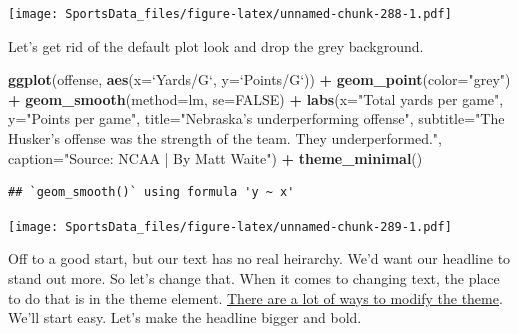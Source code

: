 \documentclass[
]{book}
\newenvironment{Shaded}{\begin{snugshade}}{\end{snugshade}}
\newcommand{\DataTypeTok}[1]{\textcolor[rgb]{0.13,0.29,0.53}{#1}}
\newcommand{\KeywordTok}[1]{\textcolor[rgb]{0.13,0.29,0.53}{\textbf{#1}}}
\newcommand{\NormalTok}[1]{#1}
\newcommand{\OperatorTok}[1]{\textcolor[rgb]{0.81,0.36,0.00}{\textbf{#1}}}
\newcommand{\OtherTok}[1]{\textcolor[rgb]{0.56,0.35,0.01}{#1}}
\newcommand{\StringTok}[1]{\textcolor[rgb]{0.31,0.60,0.02}{#1}}
\begin{document}
\texttt{[image: SportsData\_files/figure-latex/unnamed-chunk-288-1.pdf]}

Let's get rid of the default plot look and drop the grey background.

\begin{Shaded}
\begin{Highlighting}[]
\KeywordTok{ggplot}\NormalTok{(offense, }\KeywordTok{aes}\NormalTok{(}\DataTypeTok{x=}\StringTok{`}\DataTypeTok{Yards/G}\StringTok{`}\NormalTok{, }\DataTypeTok{y=}\StringTok{`}\DataTypeTok{Points/G}\StringTok{`}\NormalTok{)) }\OperatorTok{+}\StringTok{ }
\StringTok{  }\KeywordTok{geom_point}\NormalTok{(}\DataTypeTok{color=}\StringTok{"grey"}\NormalTok{) }\OperatorTok{+}\StringTok{ }\KeywordTok{geom_smooth}\NormalTok{(}\DataTypeTok{method=}\NormalTok{lm, }\DataTypeTok{se=}\OtherTok{FALSE}\NormalTok{) }\OperatorTok{+}\StringTok{ }
\StringTok{  }\KeywordTok{labs}\NormalTok{(}\DataTypeTok{x=}\StringTok{"Total yards per game"}\NormalTok{, }\DataTypeTok{y=}\StringTok{"Points per game"}\NormalTok{, }\DataTypeTok{title=}\StringTok{"Nebraska's underperforming offense"}\NormalTok{, }\DataTypeTok{subtitle=}\StringTok{"The Husker's offense was the strength of the team. They underperformed."}\NormalTok{, }\DataTypeTok{caption=}\StringTok{"Source: NCAA | By Matt Waite"}\NormalTok{) }\OperatorTok{+}\StringTok{ }
\StringTok{  }\KeywordTok{theme_minimal}\NormalTok{()}
\end{Highlighting}
\end{Shaded}

\begin{verbatim}
## `geom_smooth()` using formula 'y ~ x'
\end{verbatim}

\texttt{[image: SportsData\_files/figure-latex/unnamed-chunk-289-1.pdf]}

Off to a good start, but our text has no real heirarchy. We'd want our headline to stand out more. So let's change that. When it comes to changing text, the place to do that is in the theme element. \href{http://ggplot2.tidyverse.org/reference/theme.html}{There are a lot of ways to modify the theme}. We'll start easy. Let's make the headline bigger and bold.
\end{document}
